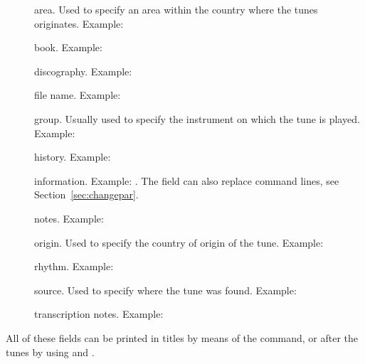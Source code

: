 \documentclass[a4paper,fullpage,12pt]{book}
\begin{document}
\begin{description}
  
  \item [] area. Used to specify an area within the country
  where the tunes originates. Example: 
  
  \item [] book. Example: 
  
  \item [] discography. Example: 
  
  \item [] file name. Example:
  
  \item [] group. Usually used to specify the instrument on
  which the tune is played. Example: 
  
  \item [] history. Example: 
  
  \item [] information. Example:
  . The  field can also
  replace command lines, see Section~\ref{sec:changepar}.
  
  \item [] notes. Example:
  
  \item [] origin. Used to specify the country of origin
  of the tune. Example: 
  
  \item [] rhythm. Example: 
  
  \item [] source. Used to specify where the \ABC{} tune
  was found. Example: 
  
  \item [] transcription notes. Example:
  
\end{description}

All of these fields can be printed in titles by means of the
 command, or after the tunes by using
 and .
\end{document}
